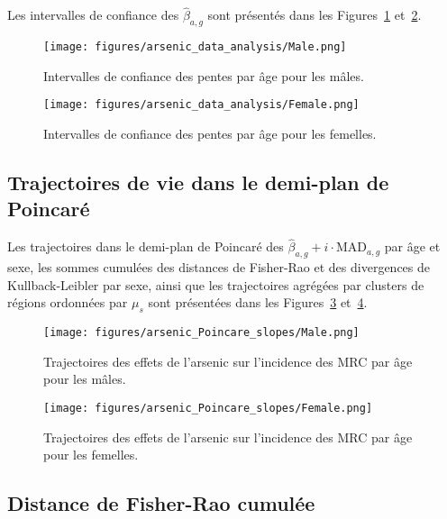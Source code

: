 Les intervalles de confiance des \(\hat{\beta}_{a,g}\) sont présentés dans les Figures~\ref{fig:CI-arsenic-males} et~\ref{fig:CI-arsenic-females}.

\begin{figure}[H]
	\centering
	\texttt{[image: figures/arsenic\_data\_analysis/Male.png]}
	\caption{Intervalles de confiance des pentes par âge pour les mâles.}
	\label{fig:CI-arsenic-males}
\end{figure}

\begin{figure}[H]
	\centering
	\texttt{[image: figures/arsenic\_data\_analysis/Female.png]}
	\caption{Intervalles de confiance des pentes par âge pour les femelles.}
	\label{fig:CI-arsenic-females}
\end{figure}

\subsection{Trajectoires de vie dans le demi-plan de Poincaré}

Les trajectoires dans le demi-plan de Poincaré des \(\hat{\beta}_{a,g} + i \cdot \mathrm{MAD}_{a,g}\) par âge et sexe, les sommes cumulées des distances de Fisher-Rao et des divergences de Kullback-Leibler par sexe, ainsi que les trajectoires agrégées par clusters de régions ordonnées par \(\mu_s\) sont présentées dans les Figures~\ref{fig:trajectoires-arsenic-males} et~\ref{fig:trajectoires-arsenic-females}.

\begin{figure}[H]
	\centering
	\texttt{[image: figures/arsenic\_Poincare\_slopes/Male.png]}
	\caption{Trajectoires des effets de l'arsenic sur l'incidence des MRC par âge pour les mâles.}
	\label{fig:trajectoires-arsenic-males}
\end{figure}

\begin{figure}[H]
	\centering
	\texttt{[image: figures/arsenic\_Poincare\_slopes/Female.png]}
	\caption{Trajectoires des effets de l'arsenic sur l'incidence des MRC par âge pour les femelles.}
	\label{fig:trajectoires-arsenic-females}
\end{figure}

\subsection{Distance de Fisher-Rao cumulée}

